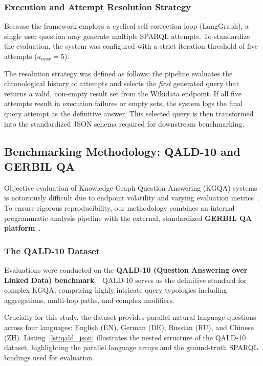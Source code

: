 \subsubsection{Execution and Attempt Resolution Strategy}
Because the framework employs a cyclical self-correction loop (LangGraph), a single user question may generate multiple SPARQL attempts. To standardize the evaluation, the system was configured with a strict iteration threshold of five attempts ($a_{max} = 5$). 

The resolution strategy was defined as follows: the pipeline evaluates the chronological history of attempts and selects the \textit{first} generated query that returns a valid, non-empty result set from the Wikidata endpoint. If all five attempts result in execution failures or empty sets, the system logs the final query attempt as the definitive answer. This selected query is then transformed into the standardized JSON schema required for downstream benchmarking.

\subsection{Benchmarking Methodology: QALD-10 and GERBIL QA}
\label{sec:gerbil_qa}

Objective evaluation of Knowledge Graph Question Answering (KGQA) systems is notoriously difficult due to endpoint volatility and varying evaluation metrics~\cite{dimitrakis_survey_2020}. To ensure rigorous reproducibility, our methodology combines an internal programmatic analysis pipeline with the external, standardized \textbf{GERBIL QA platform}~\cite{usbeck2019gerbilqa}.

\subsubsection{The QALD-10 Dataset}
Evaluations were conducted on the \textbf{QALD-10 (Question Answering over Linked Data) benchmark}~\cite{usbeck2019benchmarking}. QALD-10 serves as the definitive standard for complex KGQA, comprising highly intricate query typologies including aggregations, multi-hop paths, and complex modifiers. 

Crucially for this study, the dataset provides parallel natural language questions across four languages: English (EN), German (DE), Russian (RU), and Chinese (ZH). Listing~\ref{lst:qald_json} illustrates the nested structure of the QALD-10 dataset, highlighting the parallel language arrays and the ground-truth SPARQL bindings used for evaluation.

